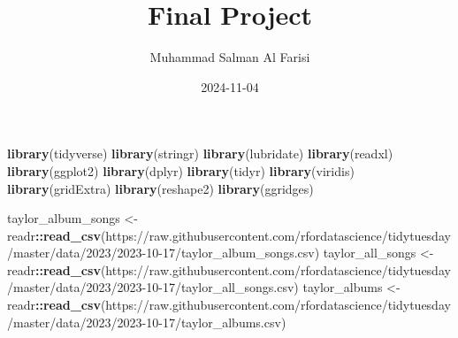 \documentclass[
]{article}
\title{Final Project}
\author{Muhammad Salman Al Farisi}
\date{2024-11-04}
\newenvironment{Shaded}{\begin{snugshade}}{\end{snugshade}}
\newcommand{\FunctionTok}[1]{\textcolor[rgb]{0.13,0.29,0.53}{\textbf{#1}}}
\newcommand{\NormalTok}[1]{#1}
\newcommand{\OtherTok}[1]{\textcolor[rgb]{0.56,0.35,0.01}{#1}}
\newcommand{\SpecialCharTok}[1]{\textcolor[rgb]{0.81,0.36,0.00}{\textbf{#1}}}
\newcommand{\StringTok}[1]{\textcolor[rgb]{0.31,0.60,0.02}{#1}}
\begin{document}
\maketitle

\begin{Shaded}
\begin{Highlighting}[]
\FunctionTok{library}\NormalTok{(tidyverse)}
\FunctionTok{library}\NormalTok{(stringr)}
\FunctionTok{library}\NormalTok{(lubridate)}
\FunctionTok{library}\NormalTok{(readxl)}
\FunctionTok{library}\NormalTok{(ggplot2)}
\FunctionTok{library}\NormalTok{(dplyr)}
\FunctionTok{library}\NormalTok{(tidyr)}
\FunctionTok{library}\NormalTok{(viridis)}
\FunctionTok{library}\NormalTok{(gridExtra) }
\FunctionTok{library}\NormalTok{(reshape2)}
\FunctionTok{library}\NormalTok{(ggridges)}
\end{Highlighting}
\end{Shaded}

\begin{Shaded}
\begin{Highlighting}[]
\NormalTok{taylor\_album\_songs }\OtherTok{\textless{}{-}}\NormalTok{ readr}\SpecialCharTok{::}\FunctionTok{read\_csv}\NormalTok{(}\StringTok{\textquotesingle{}https://raw.githubusercontent.com/rfordatascience/tidytuesday/master/data/2023/2023{-}10{-}17/taylor\_album\_songs.csv\textquotesingle{}}\NormalTok{)}
\NormalTok{taylor\_all\_songs }\OtherTok{\textless{}{-}}\NormalTok{ readr}\SpecialCharTok{::}\FunctionTok{read\_csv}\NormalTok{(}\StringTok{\textquotesingle{}https://raw.githubusercontent.com/rfordatascience/tidytuesday/master/data/2023/2023{-}10{-}17/taylor\_all\_songs.csv\textquotesingle{}}\NormalTok{)}
\NormalTok{taylor\_albums }\OtherTok{\textless{}{-}}\NormalTok{ readr}\SpecialCharTok{::}\FunctionTok{read\_csv}\NormalTok{(}\StringTok{\textquotesingle{}https://raw.githubusercontent.com/rfordatascience/tidytuesday/master/data/2023/2023{-}10{-}17/taylor\_albums.csv\textquotesingle{}}\NormalTok{)}
\end{Highlighting}
\end{Shaded}
\end{document}
